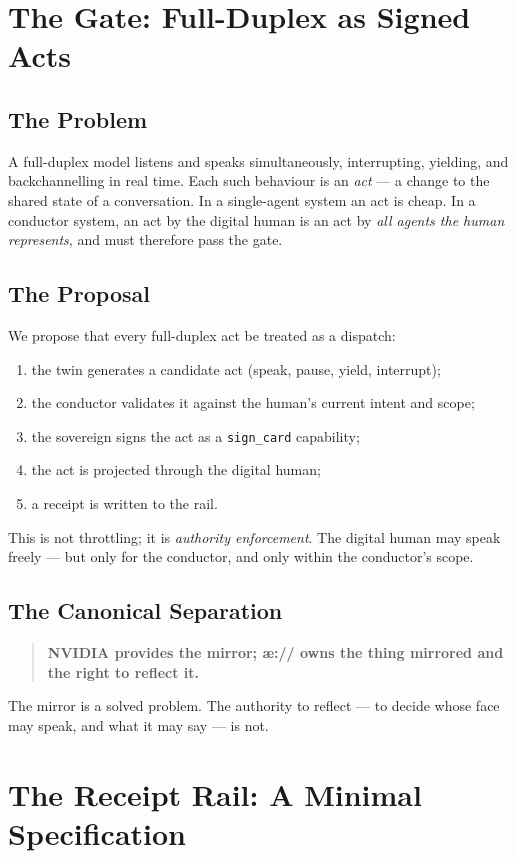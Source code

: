 \documentclass[11pt]{article}
\begin{document}
\section{The Gate: Full-Duplex as Signed Acts}

\subsection{The Problem}
A full-duplex model listens and speaks simultaneously, interrupting, yielding, and
backchannelling in real time. Each such behaviour is an \emph{act} --- a change to
the shared state of a conversation. In a single-agent system an act is cheap. In a
conductor system, an act by the digital human is an act by \emph{all agents the
human represents}, and must therefore pass the gate.

\subsection{The Proposal}
We propose that every full-duplex act be treated as a dispatch:
\begin{enumerate}[leftmargin=*]
  \item the twin generates a candidate act (speak, pause, yield, interrupt);
  \item the conductor validates it against the human's current intent and scope;
  \item the sovereign signs the act as a \texttt{sign\_card} capability;
  \item the act is projected through the digital human;
  \item a receipt is written to the rail.
\end{enumerate}
This is not throttling; it is \emph{authority enforcement}. The digital human may
speak freely --- but only for the conductor, and only within the conductor's scope.

\subsection{The Canonical Separation}
\begin{quote}
\textbf{NVIDIA provides the mirror; \ae:// owns the thing mirrored and the right to
reflect it.}
\end{quote}
The mirror is a solved problem. The authority to reflect --- to decide whose face
may speak, and what it may say --- is not.

\section{The Receipt Rail: A Minimal Specification}
\end{document}

